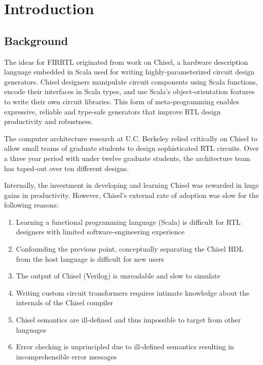 \documentclass[12pt]{article}
\begin{document}
\maketitle
\tableofcontents
\newpage


\section{Introduction}

\subsection{Background}
The ideas for FIRRTL originated from work on Chisel, a hardware description language embedded in Scala used for writing highly-parameterized circuit design generators. Chisel designers manipulate circuit components using Scala functions, encode their interfaces in Scala types, and use Scala's object-orientation features to write their own circuit libraries. This form of meta-programming enables expressive, reliable and type-safe generators that improve RTL design productivity and robustness.

The computer architecture research at U.C. Berkeley relied critically on Chisel to allow small teams of graduate students to design sophisticated RTL circuits. Over a three year period with under twelve graduate students, the architecture team has taped-out over ten different designs. 

Internally, the investment in developing and learning Chisel was rewarded in huge gains in productivity. However, Chisel's external rate of adoption was slow for the following reasons:
\begin{enumerate}[topsep=3pt,itemsep=-0.5ex,partopsep=1ex,parsep=1ex]
\item Learning a functional programming language (Scala) is difficult for RTL designers with limited software-engineering experience
\item Confounding the previous point, conceptually separating the Chisel HDL from the host language is difficult for new users
\item The output of Chisel (Verilog) is unreadable and slow to simulate
\item Writing custom circuit transformers requires intimate knowledge about the internals of the Chisel compiler
\item Chisel semantics are ill-defined and thus impossible to target from other languages
\item Error checking is unprincipled due to ill-defined semantics resulting in incomprehensible error messages
\end{enumerate}
\end{document}
